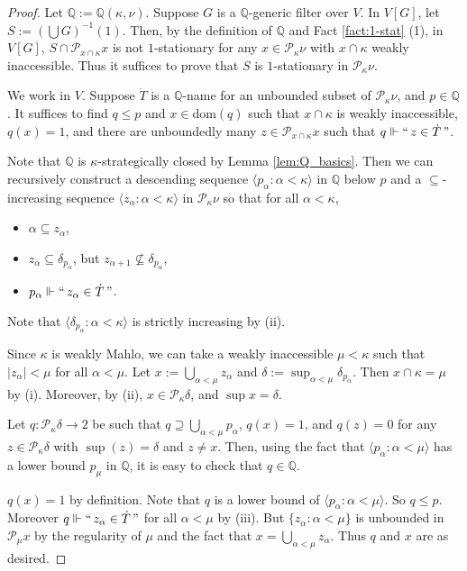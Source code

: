 \documentclass[a4paper,12pt,reqno,oneside]{amsart}
\theoremstyle{plain}
\newcommand{\mbb}{\mathbb}
\newcommand{\mcal}{\mathcal}
\newcommand{\dom}{\mathrm{dom}}
\begin{document}
\begin{proof}
Let $\mbb{Q} := \mbb{Q} ( \kappa , \nu )$. Suppose $G$ is a $\mbb{Q}$-generic filter over $V$. In $V[G]$, let $S := ( \bigcup G )^{-1} (1)$.
Then, by the definition of $\mbb{Q}$ and Fact \ref{fact:1-stat} (1), in $V[G]$, $S \cap \mcal{P}_{x \cap \kappa} x$ is not $1$-stationary for any $x \in \mcal{P}_\kappa \nu$ with $x \cap \kappa$ weakly inaccessible. Thus it suffices to prove that $S$ is $1$-stationary in $\mcal{P}_\kappa \nu$.

We work in $V$. Suppose $\dot{T}$ is a $\mbb{Q}$-name for an unbounded subset of $\mcal{P}_\kappa \nu$, and $p \in \mbb{Q}$. It suffices to find $q \leq p$ and $x \in \dom (q)$ such that $x \cap \kappa$ is weakly inaccessible, $q(x) = 1$, and there are unboundedly many $z \in \mcal{P}_{x \cap \kappa} x$ such that $q \Vdash ``\, z \in \dot{T} \,"$.

Note that $\mbb{Q}$ is $\kappa$-strategically closed by Lemma \ref{lem:Q_basics}. Then we can recursively construct a descending sequence $\langle p_\alpha : \alpha < \kappa \rangle$ in $\mbb{Q}$ below $p$ and a $\subseteq$-increasing sequence $\langle z_\alpha : \alpha < \kappa \rangle$ in $\mcal{P}_\kappa \nu$ so that for all $\alpha < \kappa$,
\begin{itemize}
\item[(i)] $\alpha \subseteq z_\alpha$,
\item[(ii)] $z_\alpha \subseteq \delta_{p_\alpha}$, but $z_{\alpha + 1} \not\subseteq \delta_{p_\alpha}$,
\item[(iii)] $p_\alpha \Vdash ``\, z_\alpha \in \dot{T} \,"$.
\end{itemize}
Note that $\langle \delta_{p_\alpha} : \alpha < \kappa \rangle$ is strictly increasing by (ii).

Since $\kappa$ is weakly Mahlo, we can take a weakly inaccessible $\mu < \kappa$ such that $| z_\alpha | < \mu$ for all $\alpha < \mu$. Let $x := \bigcup_{\alpha < \mu} z_\alpha$ and $\delta := \sup_{\alpha < \mu} \delta_{p_\alpha}$. Then $x \cap \kappa = \mu$ by (i). Moreover, by (ii), $x \in \mcal{P}_\kappa \delta$, and $\sup x = \delta$.

Let $q : \mcal{P}_\kappa \delta \to 2$ be such that $q \supseteq \bigcup_{\alpha < \mu} p_\alpha$, $q(x) = 1$, and $q (z) = 0$ for any $z \in \mcal{P}_\kappa \delta$ with $\sup (z) = \delta$ and $z \neq x$. Then, using the fact that $\langle p_\alpha : \alpha < \mu \rangle$ has a lower bound $p_\mu$ in $\mbb{Q}$, it is easy to check that $q \in \mbb{Q}$.

$q(x) = 1$ by  definition. Note that $q$ is a lower bound of $\langle p_\alpha : \alpha < \mu \rangle$. So $q \leq p$. Moreover $q \Vdash ``\,z_\alpha \in \dot{T}\,"$ for all $\alpha < \mu$ by (iii). But $\{ z_\alpha : \alpha < \mu \}$ is unbounded in $\mcal{P}_\mu x$ by the regularity of $\mu$ and the fact that $x = \bigcup_{\alpha < \mu} z_\alpha$. Thus $q$ and $x$ are as desired.
\end{proof}
\end{document}
